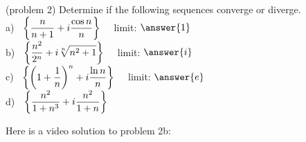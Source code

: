 \documentclass[handout]{ximera}
\begin{document}
\begin{problem}(problem 2)
Determine if the following sequences converge or diverge.\\
a) $\displaystyle \;\; \left\{\frac{n}{n+1}+ i\frac{\cos n}{n} \right\} \quad$  \quad limit: $\answer{1}$\\
b) $\displaystyle\;\;  \left\{\frac{n^2}{2^n}+ i\sqrt[n]{n^2 +1} \right\} \quad$  \quad limit: $\answer{i}$\\
c) $\displaystyle\;\; \left\{\left(1+\frac{1}{n}\right)^n+ i\frac{\ln n}{n} \right\} \quad$  \quad limit: $\answer{e}$\\
d) $\displaystyle\;\; \left\{\frac{n^2}{1+n^3}+i\frac{n^2}{1+n} \right\} \quad$  

\end{problem}

Here is a video solution to problem 2b:\\
\begin{foldable}
\end{foldable}
\end{document}
